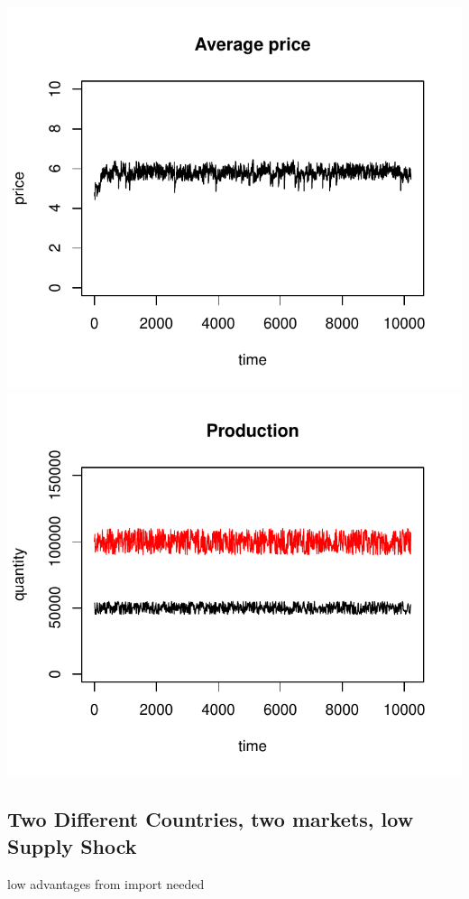 \documentclass{article}
\begin{document}
\noindent
\vskip-5mm
\hskip-1cm
\includegraphics[scale=0.5]{fig_case03_price}
\includegraphics[scale=0.5]{fig_case03_production}

\newpage

\subsection{Two Different Countries, two markets, low Supply Shock}
low advantages from import needed
\end{document}
